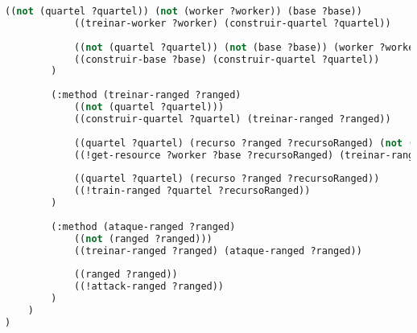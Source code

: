 \begin{lstlisting}[language=lisp]
			((not (quartel ?quartel)) (not (worker ?worker)) (base ?base))
			((treinar-worker ?worker) (construir-quartel ?quartel))
			
			((not (quartel ?quartel)) (not (base ?base)) (worker ?worker))
			((construir-base ?base) (construir-quartel ?quartel))
		)
		
		(:method (treinar-ranged ?ranged)
			((not (quartel ?quartel)))
			((construir-quartel ?quartel) (treinar-ranged ?ranged))
			
			((quartel ?quartel) (recurso ?ranged ?recursoRanged) (not (have ?recursoRanged)) (worker ?worker) (base ?base))
			((!get-resource ?worker ?base ?recursoRanged) (treinar-ranged ?ranged))
			
			((quartel ?quartel) (recurso ?ranged ?recursoRanged))
			((!train-ranged ?quartel ?recursoRanged))
		)
		
		(:method (ataque-ranged ?ranged)		
			((not (ranged ?ranged)))
			((treinar-ranged ?ranged) (ataque-ranged ?ranged))
			
			((ranged ?ranged))
			((!attack-ranged ?ranged))
		)        
	)
)

\end{lstlisting}
